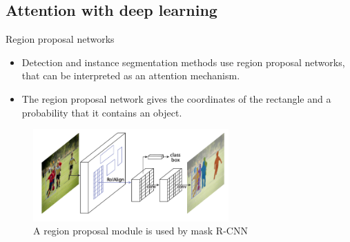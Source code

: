 \documentclass[xcolor=pdftex,dvipsnames,table,mathserif]{beamer}
\begin{document}







\subsection{Attention with deep learning}


\begin{frame}{Region proposal networks \cite{ren_faster_2015}}

  \begin{itemize}
  \item Detection and instance segmentation methods use region proposal networks, that can be interpreted as an attention mechanism.
  \item The region proposal network gives the coordinates of the rectangle and a probability that it contains an object.
  \end{itemize}


\begin{figure}
  \centering
  \includegraphics[width=7.5cm]{mask_r_cnn.png}\\
  \scriptsize{A region proposal module is used by mask R-CNN~\cite{he_mask_2017}}
  \end{figure}

\end{frame}
\end{document}
